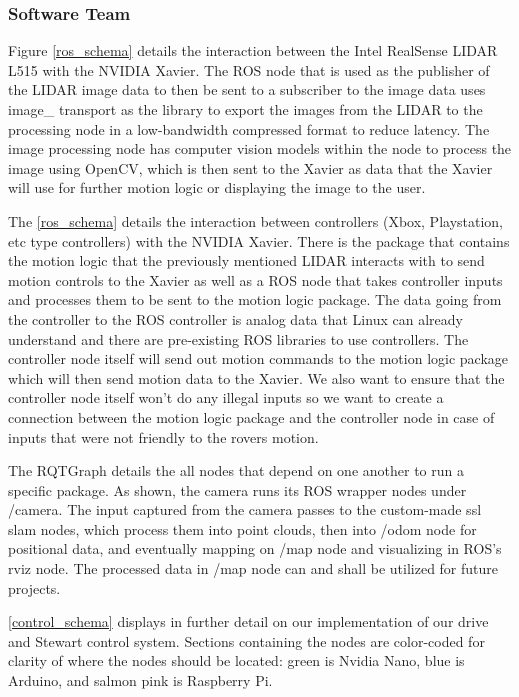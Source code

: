 \documentclass[a4paper, 10pt]{article}
\begin{document}
		\subsubsection*{Software Team}
		Figure \ref{ros_schema} details the interaction between the Intel RealSense LIDAR L515 with the NVIDIA Xavier. The ROS node that is used as the publisher of the LIDAR image data to then be sent to a subscriber to the image data uses image\_ transport as the library to export the images from the LIDAR to the processing node in a low-bandwidth compressed format to reduce latency. The image processing node has computer vision models within the node to process the image using OpenCV, which is then sent to the Xavier as data that the Xavier will use for further motion logic or displaying the image to the user.
		
		The \ref{ros_schema} details the interaction between controllers (Xbox, Playstation, etc type controllers) with the NVIDIA Xavier. There is the package that contains the motion logic that the previously mentioned LIDAR interacts with to send motion controls to the Xavier as well as a ROS node that takes controller inputs and processes them to be sent to the motion logic package. The data going from the controller to the ROS controller is analog data that Linux can already understand and there are pre-existing ROS libraries to use controllers. The controller node itself will send out motion commands to the motion logic package which will then send motion data to the Xavier. We also want to ensure that the controller node itself won't do any illegal inputs so we want to create a connection between the motion logic package and the controller node in case of inputs that were not friendly to the rovers motion.	

	The RQTGraph details the all nodes that depend on one another to run a specific package. As shown, the camera runs its ROS wrapper nodes under /camera. The input captured from the camera passes to the custom-made ssl slam nodes, which process them into point clouds, then into /odom node for positional data, and eventually mapping on /map node and visualizing in ROS's rviz node. The processed data in /map node can and shall be utilized for future projects.
	
	\ref{control_schema} displays in further detail on our implementation of our drive and Stewart control system. Sections containing the nodes are color-coded for clarity of where the nodes should be located: green is Nvidia Nano, blue is Arduino, and salmon pink is Raspberry Pi.
	
\end{document}
